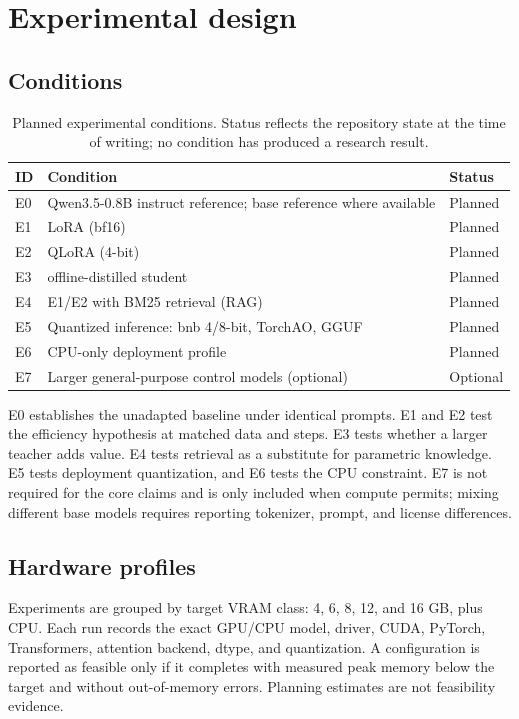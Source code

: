 \section{Experimental design}
\label{sec:design}

\subsection{Conditions}

\begin{table}[t]
\centering
\small
\caption{Planned experimental conditions. Status reflects the repository state at
the time of writing; no condition has produced a research result.}
\label{tab:conditions}
\begin{tabular}{@{}lll@{}}
\toprule
ID & Condition & Status \\
\midrule
E0 & Qwen3.5-0.8B instruct reference; base reference where available & Planned \\
E1 & \cyberlite{} LoRA (bf16) & Planned \\
E2 & \cyberlite{} QLoRA (4-bit) & Planned \\
E3 & \cyberlite{} offline-distilled student & Planned \\
E4 & E1/E2 with BM25 retrieval (RAG) & Planned \\
E5 & Quantized inference: bnb 4/8-bit, TorchAO, GGUF & Planned \\
E6 & CPU-only deployment profile & Planned \\
E7 & Larger general-purpose control models (optional) & Optional \\
\bottomrule
\end{tabular}
\end{table}

E0 establishes the unadapted baseline under identical prompts. E1 and E2 test
the efficiency hypothesis at matched data and steps. E3 tests whether a larger
teacher adds value. E4 tests retrieval as a substitute for parametric knowledge.
E5 tests deployment quantization, and E6 tests the CPU constraint. E7 is not
required for the core claims and is only included when compute permits; mixing
different base models requires reporting tokenizer, prompt, and license
differences.

\subsection{Hardware profiles}

Experiments are grouped by target VRAM class: 4, 6, 8, 12, and 16 GB, plus CPU.
Each run records the exact GPU/CPU model, driver, CUDA, PyTorch, Transformers,
attention backend, dtype, and quantization. A configuration is reported as
feasible only if it completes with measured peak memory below the target and
without out-of-memory errors. Planning estimates are not feasibility evidence.

